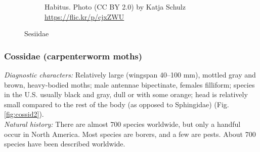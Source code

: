 \documentclass[letterpaper, 11pt]{article}
\begin{document}
\begin{figure}[ht!]
\begin{subfigure}[ht!]{0.40\textwidth}
        \caption{Habitus. Photo (CC BY 2.0) by Katja Schulz \url{https://flic.kr/p/cjxZWU}}
        \label{fig:sesiid2}
    \end{subfigure}
    \caption{Sesiidae}\label{fig:sesiids}
\end{figure}

\subsubsection{Cossidae (carpenterworm moths)}
\noindent{}\textit{Diagnostic characters:} Relatively large (wingspan 40--100 mm), mottled gray and brown, heavy-bodied moths; male antennae bipectinate, females filliform; species in the U.S. usually black and gray, dull or with some orange; head is relatively small compared to the rest of the body (as opposed to Sphingidae) (Fig. \ref{fig:cossid2}).\\

\noindent{}\textit{Natural history:} There are almost 700 species worldwide, but only a handful occur in North America. Most species are borers, and a few are pests. About 700 species have been described worldwide.
\end{document}
